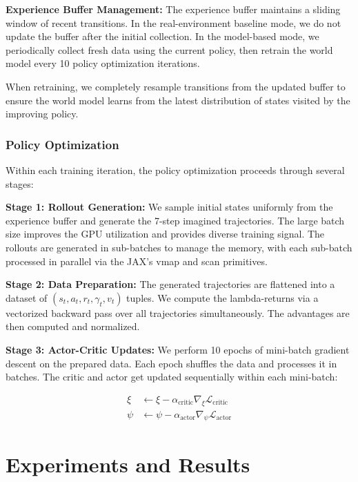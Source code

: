 \documentclass[
	english,
	ruledheaders=section,
	class=report,
	thesis={type=master},
	accentcolor=9c,
	custommargins=true,
	marginpar=false,
	parskip=half-,
	fontsize=11pt,
	pdfa=true,
]{tudapub}
\newcommand{\worldmodel}{world model}
\begin{document}
\textbf{Experience Buffer Management:} The experience buffer maintains a sliding window of recent transitions. In the real-environment baseline mode, we do not update the buffer after the initial collection. In the model-based mode, we periodically collect fresh data using the current policy, then retrain the \worldmodel{} every 10 policy optimization iterations.

When retraining, we completely resample transitions from the updated buffer to
ensure the \worldmodel{} learns from the latest distribution of states visited
by the improving policy.

\subsection{Policy Optimization}
\label{subsec:policy_optimization}

Within each training iteration, the policy optimization proceeds through
several stages:

\textbf{Stage 1: Rollout Generation:} We sample initial states uniformly from the experience buffer and generate the 7-step imagined trajectories. The large batch size improves the GPU utilization and provides diverse training signal. The rollouts are generated in sub-batches to manage the memory, with each sub-batch processed in parallel via the JAX's vmap and scan primitives.

\textbf{Stage 2: Data Preparation:} The generated trajectories are flattened into a dataset of $(s_t, a_t, r_t, \gamma_t, v_t)$ tuples. We compute the lambda-returns via a vectorized backward pass over all trajectories simultaneously. The advantages are then computed and normalized.

\textbf{Stage 3: Actor-Critic Updates:} We perform 10 epochs of mini-batch gradient descent on the prepared data. Each epoch shuffles the data and processes it in batches. The critic and actor get updated sequentially within each mini-batch:

\begin{align}
	\xi  & \gets \xi - \alpha_{\text{critic}} \nabla_\xi \mathcal{L}_{\text{critic}} \\
	\psi & \gets \psi - \alpha_{\text{actor}} \nabla_\psi \mathcal{L}_{\text{actor}}
\end{align}



\chapter{Experiments and Results}
\label{chap:experiments}
\end{document}
